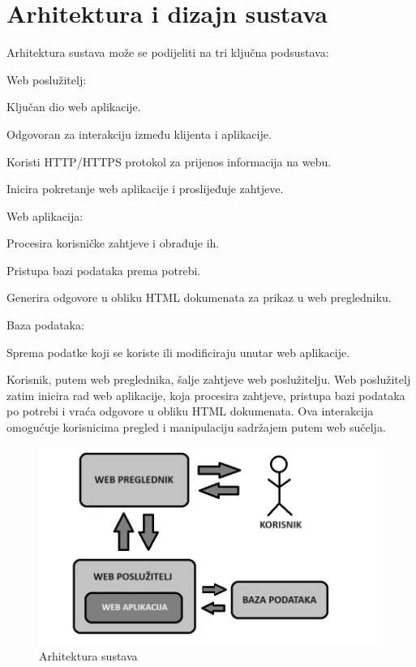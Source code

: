 \chapter{Arhitektura i dizajn sustava}

Arhitektura sustava može se podijeliti na tri ključna podsustava:

\begin{packed_enum}
	\item Web poslužitelj:
	\begin{packed_enum}
		\item Ključan dio web aplikacije.
		\item Odgovoran za interakciju između klijenta i aplikacije.
		\item Koristi HTTP/HTTPS protokol za prijenos informacija na webu.
		\item Inicira pokretanje web aplikacije i proslijeđuje zahtjeve.
	\end{packed_enum}
	\item Web aplikacija:
	\begin{packed_enum}
		\item Procesira korisničke zahtjeve i obrađuje ih.
		\item Pristupa bazi podataka prema potrebi.
		\item Generira odgovore u obliku HTML dokumenata za prikaz u web pregledniku.
	\end{packed_enum}			
	\item Baza podataka:	
	\begin{packed_enum}
		\item Sprema podatke koji se koriste ili modificiraju unutar web aplikacije.
	\end{packed_enum}
\end{packed_enum}

Korisnik, putem web preglednika, šalje zahtjeve web poslužitelju. 
Web poslužitelj zatim inicira rad web aplikacije, koja procesira zahtjeve, pristupa bazi podataka po potrebi i vraća odgovore u obliku HTML dokumenata. 
Ova interakcija omogućuje korisnicima pregled i manipulaciju sadržajem putem web sučelja.

\begin{figure}[H]
	\includegraphics[scale=0.5]{slike/arhitektura.png}
	\centering
	\caption{Arhitektura sustava}
	\label{fig:arhitektura}
\end{figure}

